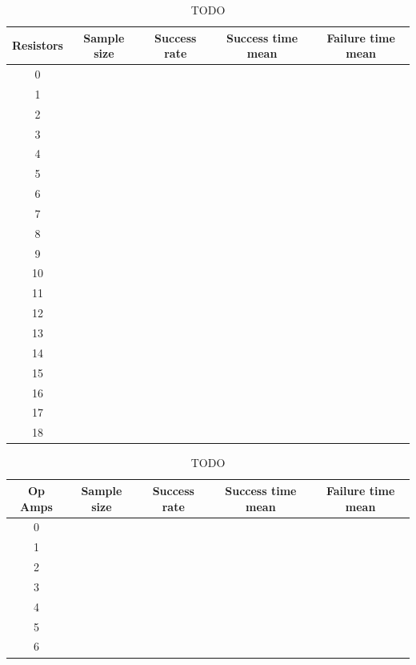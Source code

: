 \begin{table}[H]
\begin{center}
\begin{singlespace}
\begin{tabular}{| c | c | c | c | c |}
\hline
Resistors & Sample size & Success rate & Success time mean & Failure time mean\\
\hline\hline
0 & & & & \\
1 & & & & \\
2 & & & & \\
3 & & & & \\
4 & & & & \\
5 & & & & \\
6 & & & & \\
7 & & & & \\
8 & & & & \\
9 & & & & \\
10 & & & & \\
11 & & & & \\
12 & & & & \\
13 & & & & \\
14 & & & & \\
15 & & & & \\
16 & & & & \\
17 & & & & \\
18 & & & & \\
\hline
\end{tabular}
\end{singlespace}
\end{center}
\label{tb:TODO}
\caption{TODO}
\end{table}

\begin{table}[H]
\begin{center}
\begin{singlespace}
\begin{tabular}{| c | c | c | c | c |}
\hline
Op Amps & Sample size & Success rate & Success time mean & Failure time mean\\
\hline\hline
0 & & & & \\
1 & & & & \\
2 & & & & \\
3 & & & & \\
4 & & & & \\
5 & & & & \\
6 & & & & \\
\hline
\end{tabular}
\end{singlespace}
\end{center}
\label{tb:TODO}
\caption{TODO}
\end{table}

